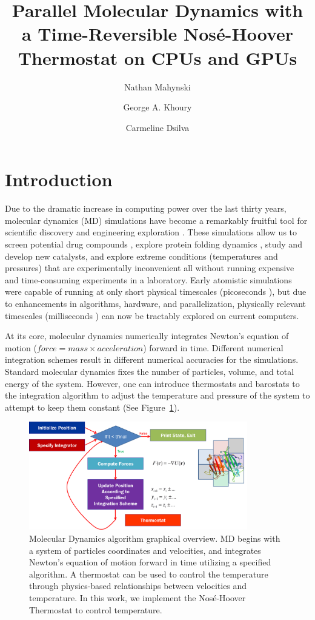 \documentclass[12pt]{article}
\title{Parallel Molecular Dynamics with a Time-Reversible Nos\'{e}-Hoover Thermostat on CPUs and GPUs}
\author{Nathan Mahynski \and George A. Khoury \and Carmeline Dsilva}
\begin{document}
\maketitle

\section{Introduction}

Due to the dramatic increase in computing power over the last thirty years, molecular dynamics (MD) simulations have become a remarkably fruitful tool for scientific discovery and engineering exploration \cite{Karplus2002,Levitt2001}.
%
These simulations allow us to screen potential drug compounds \cite{Jorgensen2004}, explore protein folding dynamics \cite{Duan1998,Shaw2010,Piana2013,Lindorff-Larsen2011}, study \cite{Boero1998} and develop \cite{Zipoli2010} new catalysts, and explore extreme conditions (temperatures and pressures) that are experimentally inconvenient all without running expensive and time-consuming experiments in a laboratory.
%
Early atomistic simulations were capable of running at only short physical timescales (picoseconds \cite{Karplus1979}), but due to enhancements in algorithms, hardware, and parallelization, physically relevant timescales (milliseconds \cite{Kohlhoff2014}) can now be tractably explored on current computers.

At its core, molecular dynamics numerically integrates Newton's equation of motion ($force = mass \times acceleration$) forward in time.
%
Different numerical integration schemes result in different numerical accuracies for the simulations.
%
Standard molecular dynamics fixes the number of particles, volume, and total energy of the system.
%
However, one can introduce thermostats and barostats to the integration algorithm to adjust the temperature and pressure of the system to attempt to keep them constant (See Figure~\ref{fig:mdfigure}).

\begin{figure}
\centering
\includegraphics[width=0.85\textwidth]{mdfigure.png}
\caption{Molecular Dynamics algorithm graphical overview. MD begins with a system of particles coordinates and velocities, and integrates Newton's equation of motion forward in time utilizing a specified algorithm. A thermostat can be used to control the temperature through physics-based relationships between velocities and temperature. In this work, we implement the Nos\'{e}-Hoover Thermostat to control temperature.}
\label{fig:mdfigure}
\end{figure}
\end{document}
